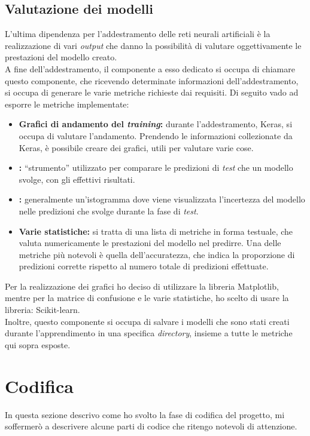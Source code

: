 \subsection{Valutazione dei modelli}\noindent
L'ultima dipendenza per l'addestramento delle reti neurali artificiali è la realizzazione di vari \textit{output} che danno la possibilità di valutare oggettivamente le prestazioni del modello creato.\\
A fine dell'addestramento, il componente a esso dedicato si occupa di chiamare questo componente, che ricevendo determinate informazioni dell'addestramento, si occupa di generare le varie metriche richieste dai requisiti.
Di seguito vado ad esporre le metriche implementate:
\begin{itemize}
    \item \textbf{Grafici di andamento del \textit{training}:} durante l'addestramento, Keras, si occupa di valutare l'andamento. Prendendo le informazioni collezionate da Keras, è possibile creare dei grafici, utili per valutare varie cose.
    \item \textbf{:} ``strumento'' utilizzato per comparare le predizioni di \textit{test} che un modello svolge, con gli effettivi risultati.
    \item \textbf{:} generalmente un'istogramma dove viene visualizzata l'incertezza del modello nelle predizioni che svolge durante la fase di \textit{test}.
    \item \textbf{Varie statistiche:} si tratta di una lista di metriche in forma testuale, che valuta numericamente le prestazioni del modello nel predirre. Una delle metriche più notevoli è quella dell'accuratezza, che indica la proporzione di predizioni corrette rispetto al numero totale di predizioni effettuate.
\end{itemize}
Per la realizzazione dei grafici ho deciso di utilizzare la libreria Matplotlib, mentre per la matrice di confusione e le varie statistiche, ho scelto di usare la libreria: Scikit-learn.\\
Inoltre, questo componente si occupa di salvare i modelli che sono stati creati durante l'apprendimento in una specifica \textit{directory}, insieme a tutte le metriche qui sopra esposte.

\section{Codifica}\label{sec:coding}\noindent
In questa sezione descrivo come ho svolto la fase di codifica del progetto, mi soffermerò a descrivere alcune parti di codice che ritengo notevoli di attenzione.


